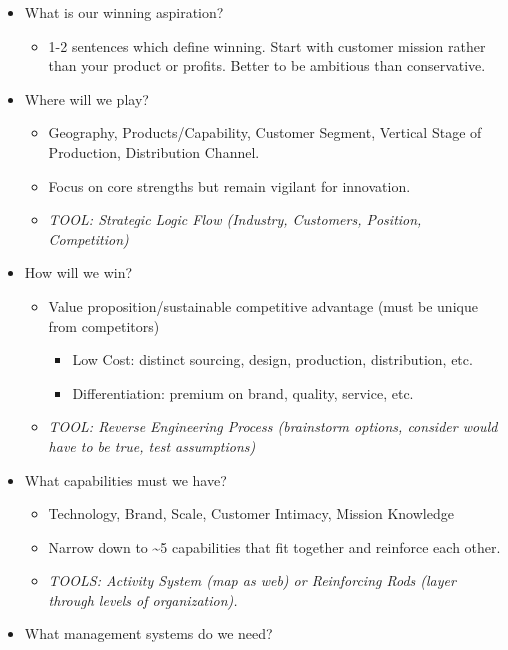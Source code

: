 \documentclass[
]{article}
\providecommand{\tightlist}{%
  \setlength{\itemsep}{0pt}\setlength{\parskip}{0pt}}
\begin{document}
\begin{itemize}
\item
  What is our winning aspiration?

  \begin{itemize}
  \tightlist
  \item
    1-2 sentences which define winning. Start with customer mission
    rather than your product or profits. Better to be ambitious than
    conservative.
  \end{itemize}
\item
  Where will we play?

  \begin{itemize}
  \item
    Geography, Products/Capability, Customer Segment, Vertical Stage of
    Production, Distribution Channel.
  \item
    Focus on core strengths but remain vigilant for innovation.
  \item
    \emph{TOOL: Strategic Logic Flow (Industry, Customers, Position,
    Competition)}
  \end{itemize}
\item
  How will we win?

  \begin{itemize}
  \item
    Value proposition/sustainable competitive advantage (must be unique
    from competitors)

    \begin{itemize}
    \item
      Low Cost: distinct sourcing, design, production, distribution,
      etc.
    \item
      Differentiation: premium on brand, quality, service, etc.
    \end{itemize}
  \item
    \emph{TOOL: Reverse Engineering Process (brainstorm options,
    consider would have to be true, test assumptions)}
  \end{itemize}
\item
  What capabilities must we have?

  \begin{itemize}
  \item
    Technology, Brand, Scale, Customer Intimacy, Mission Knowledge
  \item
    Narrow down to \textasciitilde5 capabilities that fit together and
    reinforce each other.
  \item
    \emph{TOOLS: Activity System (map as web) or Reinforcing Rods (layer
    through levels of organization).}
  \end{itemize}
\item
  What management systems do we need?


\end{itemize}
\end{document}
